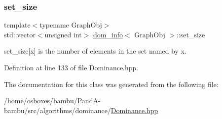 \subsubsection{\texorpdfstring{set\+\_\+size}{set\_size}}
{\footnotesize\ttfamily template$<$typename Graph\+Obj$>$ \\
std\+::vector$<$unsigned int$>$ \hyperlink{classdom__info}{dom\+\_\+info}$<$ Graph\+Obj $>$\+::set\+\_\+size\hspace{0.3cm}{\ttfamily [private]}}



set\+\_\+size\mbox{[}x\mbox{]} is the number of elements in the set named by x. 



Definition at line 133 of file Dominance.\+hpp.



The documentation for this class was generated from the following file\+:\begin{DoxyCompactItemize}
\item 
/home/osboxes/bambu/\+Pand\+A-\/bambu/src/algorithms/dominance/\hyperlink{Dominance_8hpp}{Dominance.\+hpp}\end{DoxyCompactItemize}
